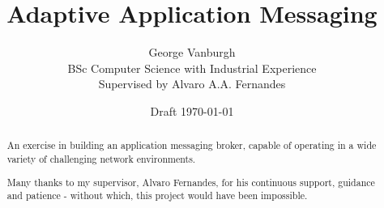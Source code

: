 \documentclass[a4paper,12pt,titlepage]{article}
\title{Adaptive Application Messaging}
\author{George Vanburgh\\
        BSc Computer Science with Industrial Experience\\
        Supervised by Alvaro A.A. Fernandes}
\date{Draft \today}
\begin{document}
  

  \maketitle

  \begin{abstract}
    An exercise in building an application messaging broker, capable of operating
    in a wide variety of challenging network environments.
  \end{abstract}

  \renewcommand{\abstractname}{Acknowledgements}
  \begin{abstract}
   Many thanks to my supervisor, Alvaro Fernandes, for his continuous support,
   guidance and patience - without which, this project would have been impossible.
  \end{abstract}

  \tableofcontents
  \begin{versionhistory}
  \end{versionhistory}
  \newpage

  

  \newpage

  \printglossaries

  \newpage


  \printbibliography
\end{document}
